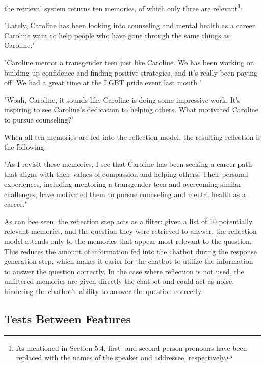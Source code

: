 \noindent the retrieval system returns ten memories, of which only three are relevant\footnote{As mentioned in Section 5.4, first- and second-person pronouns have been replaced with the names of the speaker and addressee, respectively.}:

\begin{displayquote}
"Lately, Caroline has been looking into counseling and mental health as a career. Caroline want to help people who have gone through the same things as Caroline."

"Caroline mentor a transgender teen just like Caroline. We has been working on building up confidence and finding positive strategies, and it's really been paying off! We had a great time at the LGBT pride event last month."

"Woah, Caroline, it sounds like Caroline is doing some impressive work. It's inspiring to see Caroline's dedication to helping others. What motivated Caroline to pursue counseling?"
\end{displayquote}

\noindent When all ten memories are fed into the reflection model, the resulting reflection is the following:

\begin{displayquote}
"As I revisit these memories, I see that Caroline has been seeking a career path that aligns with their values of compassion and helping others. Their personal experiences, including mentoring a transgender teen and overcoming similar challenges, have motivated them to pursue counseling and mental health as a career."
\end{displayquote}

\noindent As can bee seen, the reflection step acts as a filter: given a list of 10 potentially relevant memories, and the question they were retrieved to answer, the reflection model attends only to the memories that appear most relevant to the question. This reduces the amount of information fed into the chatbot during the response generation step, which makes it easier for the chatbot to utilize the information to answer the question correctly. In the case where reflection is not used, the unfiltered memories are given directly the chatbot and could act as noise, hindering the chatbot's ability to answer the question correctly.



\subsection{Tests Between Features}

